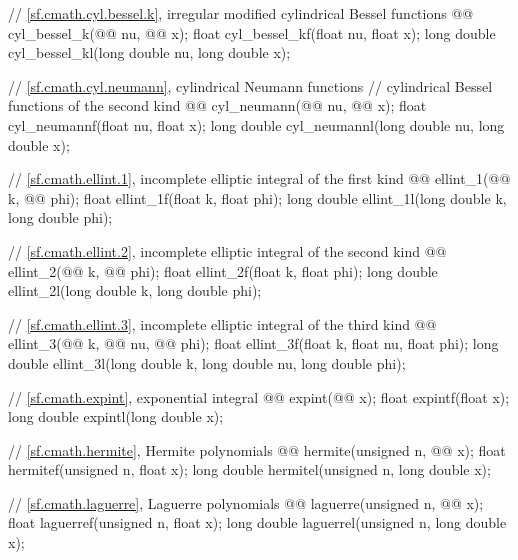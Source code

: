 \begin{codeblock}
{  // \ref{sf.cmath.cyl.bessel.k}, irregular modified cylindrical Bessel functions
  @@ cyl_bessel_k(@@ nu, @@ x);
  float               cyl_bessel_kf(float nu, float x);
  long double         cyl_bessel_kl(long double nu, long double x);

  // \ref{sf.cmath.cyl.neumann}, cylindrical Neumann functions
  // cylindrical Bessel functions of the second kind
  @@ cyl_neumann(@@ nu, @@ x);
  float               cyl_neumannf(float nu, float x);
  long double         cyl_neumannl(long double nu, long double x);

  // \ref{sf.cmath.ellint.1}, incomplete elliptic integral of the first kind
  @@ ellint_1(@@ k, @@ phi);
  float               ellint_1f(float k, float phi);
  long double         ellint_1l(long double k, long double phi);

  // \ref{sf.cmath.ellint.2}, incomplete elliptic integral of the second kind
  @@ ellint_2(@@ k, @@ phi);
  float               ellint_2f(float k, float phi);
  long double         ellint_2l(long double k, long double phi);

  // \ref{sf.cmath.ellint.3}, incomplete elliptic integral of the third kind
  @@ ellint_3(@@ k, @@ nu,
                                 @@ phi);
  float               ellint_3f(float k, float nu, float phi);
  long double         ellint_3l(long double k, long double nu, long double phi);

  // \ref{sf.cmath.expint}, exponential integral
  @@ expint(@@ x);
  float               expintf(float x);
  long double         expintl(long double x);

  // \ref{sf.cmath.hermite}, Hermite polynomials
  @@ hermite(unsigned n, @@ x);
  float               hermitef(unsigned n, float x);
  long double         hermitel(unsigned n, long double x);

  // \ref{sf.cmath.laguerre}, Laguerre polynomials
  @@ laguerre(unsigned n, @@ x);
  float               laguerref(unsigned n, float x);
  long double         laguerrel(unsigned n, long double x);

}
\end{codeblock}
